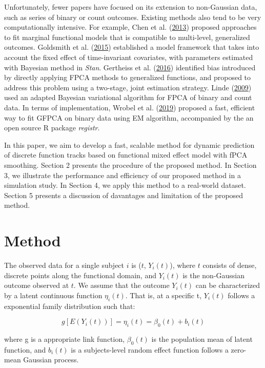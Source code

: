 \documentclass[
  11pt,
]{article}
\begin{document}
Unfortunately, fewer papers have focused on its extension to
non-Gaussian data, such as series of binary or count outcomes. Existing
methods also tend to be very computationally intensive. For example,
Chen et al. (\protect\hyperlink{ref-chen2013}{2013}) proposed approaches
to fit marginal functional models that is compatible to multi-level,
generalized outcomes. Goldsmith et al.
(\protect\hyperlink{ref-goldsmith2015}{2015}) established a model
framework that takes into account the fixed effect of time-invariant
covariates, with parameters estimated with Bayesian method in
\emph{Stan}. Gertheiss et al.
(\protect\hyperlink{ref-gertheiss2016}{2016}) identified bias introduced
by directly applying FPCA methods to generalized functions, and proposed
to address this problem using a two-stage, joint estimation strategy.
Linde (\protect\hyperlink{ref-linde2019}{2009}) used an adapted Bayesian
variational algorithm for FPCA of binary and count data. In terms of
implementation, Wrobel et al. (\protect\hyperlink{ref-wrobel2019}{2019})
proposed a fast, efficient way to fit GFPCA on binary data using EM
algorithm, accompanied by the an open source R package \emph{registr}.

In this paper, we aim to develop a fast, scalable method for dynamic
prediction of discrete function tracks based on functional mixed effect
model with fPCA smoothing. Section 2 presents the procedure of the
proposed method. In Section 3, we illustrate the performance and
efficiency of our proposed method in a simulation study. In Section 4,
we apply this method to a real-world dataset. Section 5 presents a
discussion of davantages and limitation of the proposed method.

\hypertarget{method}{%
\section{Method}\label{method}}

The observed data for a single subject \(i\) is (\(t\), \(Y_i(t)\)),
where \(t\) consists of dense, discrete points along the functional
domain, and \(Y_i(t)\) is the non-Gaussian outcome observed at \(t\). We
assume that the outcome \(Y_i(t)\) can be characterized by a latent
continuous function \(\eta_i(t)\). That is, at a specific t, \(Y_i(t)\)
follows a exponential family distribution such that:

\[
g[E(Y_i(t))] = \eta_i(t) = \beta_0(t)+b_i(t)
\]

where g is a appropriate link function, \(\beta_0(t)\) is the population
mean of latent function, and \(b_i(t)\) is a subjects-level random
effect function follows a zero-mean Gaussian process.
\end{document}
